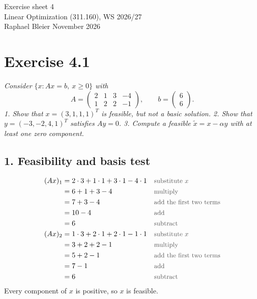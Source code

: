 \documentclass[a4paper,11pt]{article}
\newif\ifexplain
\newcommand{\aufgabe}[1]{\section*{Exercise #1}}
\newcommand{\angabe}[1]{\textit{#1}\par\smallskip}
\newcommand{\teil}[1]{\subsection*{#1}}
\newcommand{\why}[1]{\text{\small\color{black!65}#1}}
\newcommand{\explain}[1]{\ifexplain\begin{erklbox}#1\end{erklbox}\fi}
\begin{document}
\begin{center}
{\Large Exercise sheet 4}\\
Linear Optimization (311.160), WS 2026/27\\
Raphael Bleier  November 2026
\end{center}
\explain{Wir suchen in einem Gleichungssystem mit nichtnegativen Variablen eine zulässige Basislösung. Bei zwei unabhängigen Gleichungen wählen wir dafür zwei unabhängige Spalten als Basis. Alle anderen Variablen setzen wir auf null. Ein zulässiger Punkt kann mehr positive Komponenten haben; dann ist er noch keine Basislösung. Mit einer Richtung im Kern von $A$ ändern wir die Komponenten, ohne $Ax=b$ zu verändern. Wir gehen nur so weit, bis eine weitere Komponente null wird.}

\aufgabe{4.1}
\angabe{Consider $\{x:Ax=b,\ x\geq0\}$ with
\[
A=\begin{pmatrix}2&1&3&-4\\1&2&2&-1\end{pmatrix},\qquad b=\begin{pmatrix}6\\6\end{pmatrix}.
\]
1. Show that $x=(3,1,1,1)^T$ is feasible, but not a basic solution.
2. Show that $y=(-3,-2,4,1)^T$ satisfies $Ay=0$.
3. Compute a feasible $\widetilde x=x-\alpha y$ with at least one zero component.}
\teil{1. Feasibility and basis test}
\begin{align*}
(Ax)_1&=2\cdot3+1\cdot1+3\cdot1-4\cdot1&&\why{substitute $x$}\\
&=6+1+3-4&&\why{multiply}\\
&=7+3-4&&\why{add the first two terms}\\
&=10-4&&\why{add}\\
&=6&&\why{subtract}\\
(Ax)_2&=1\cdot3+2\cdot1+2\cdot1-1\cdot1&&\why{substitute $x$}\\
&=3+2+2-1&&\why{multiply}\\
&=5+2-1&&\why{add the first two terms}\\
&=7-1&&\why{add}\\
&=6&&\why{subtract}
\end{align*}
Every component of $x$ is positive, so $x$ is feasible.
\explain{Wir prüfen beide Bedingungen getrennt: Die Gleichungen müssen stimmen und keine Komponente darf negativ sein. Dass vier Zahlen die Gleichungen erfüllen, sagt noch nichts darüber aus, ob wir sie als Basislösung erhalten. Dafür zählt die Zahl der unabhängigen Spalten.}
\end{document}
